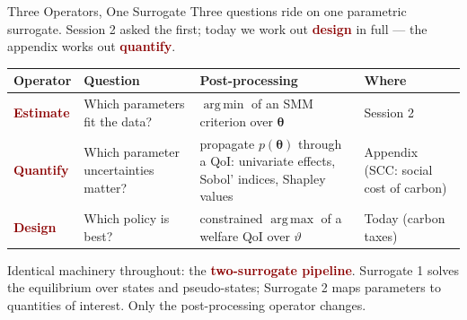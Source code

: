 \documentclass[10pt,aspectratio=169]{beamer}
\newcommand{\emphc}[1]{\textbf{\textcolor{darkred}{#1}}}
\DeclareMathOperator*{\argmin}{arg\,min}
\DeclareMathOperator*{\argmax}{arg\,max}
\begin{document}
\begin{frame}{Three Operators, One Surrogate}
\small
Three questions ride on one parametric surrogate. Session 2 asked the first; today we work out \emphc{design} in full --- the appendix works out \emphc{quantify}.
\vspace{0.5em}
\begin{center}
\footnotesize
\begin{tabular}{p{}p{}p{}p{}}
\toprule
\textbf{Operator} & \textbf{Question} & \textbf{Post-processing} & \textbf{Where} \\
\midrule
\emphc{Estimate} & Which parameters fit the data? & $\argmin$ of an SMM criterion over $\bm{\theta}$ & Session 2 \\[3pt]
\emphc{Quantify} & Which parameter uncertainties matter? & propagate $p(\bm{\theta})$ through a QoI: univariate effects, Sobol' indices, Shapley values & Appendix (SCC: social cost of carbon) \\[3pt]
\emphc{Design} & Which policy is best? & constrained $\argmax$ of a welfare QoI over $\vartheta$ & Today (carbon taxes) \\
\bottomrule
\end{tabular}
\end{center}
\vspace{0.5em}
Identical machinery throughout: the \emphc{two-surrogate pipeline}. Surrogate 1 solves the equilibrium over states and pseudo-states; Surrogate 2 maps parameters to quantities of interest. Only the post-processing operator changes.
\end{frame}
\end{document}
